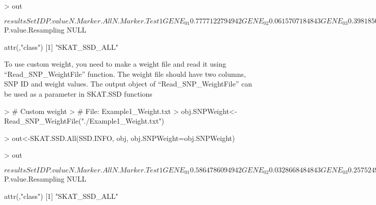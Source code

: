 \documentclass[11pt]{article}
\begin{document}
\begin{Schunk}
\begin{Sinput}
> out
\end{Sinput}
\begin{Soutput}
$results
     SetID    P.value N.Marker.All N.Marker.Test
1  GENE_01 0.77771227           94            94
2  GENE_02 0.06157071           84            84
3  GENE_03 0.39818504          108           108
4  GENE_04 0.46548442          101           101
5  GENE_05 0.18981516          103           103
6  GENE_06 0.94073952           94            94
7  GENE_07 0.18779019          104           104
8  GENE_08 0.74559501           96            96
9  GENE_09 0.66573796          100           100
10 GENE_10 0.40204308          100           100

$P.value.Resampling
NULL

attr(,"class")
[1] "SKAT_SSD_ALL"
\end{Soutput}
\end{Schunk}

To use custom weight, you need to make a weight file and read it using
``Read\_SNP\_WeightFile'' function. The weight file should have two columns, 
SNP ID and weight values. The output object of ``Read\_SNP\_WeightFile''
can be used as a parameter in SKAT.SSD functions

\begin{Schunk}
\begin{Sinput}
> # Custom weight
> # File: Example1_Weight.txt
> obj.SNPWeight<-Read_SNP_WeightFile("./Example1_Weight.txt")
\end{Sinput}
\end{Schunk}

\begin{Schunk}
\begin{Sinput}
> out<-SKAT.SSD.All(SSD.INFO, obj, obj.SNPWeight=obj.SNPWeight)
\end{Sinput}
\end{Schunk}
\begin{Schunk}
\begin{Sinput}
> out
\end{Sinput}
\begin{Soutput}
$results
     SetID    P.value N.Marker.All N.Marker.Test
1  GENE_01 0.58647860           94            94
2  GENE_02 0.03286684           84            84
3  GENE_03 0.25752493          108           108
4  GENE_04 0.18486050          101           101
5  GENE_05 0.43670123          103           103
6  GENE_06 0.98039703           94            94
7  GENE_07 0.12460640          104           104
8  GENE_08 0.78814493           96            96
9  GENE_09 0.80206141          100           100
10 GENE_10 0.34070404          100           100

$P.value.Resampling
NULL

attr(,"class")
[1] "SKAT_SSD_ALL"
\end{Soutput}
\end{Schunk}
\end{document}

